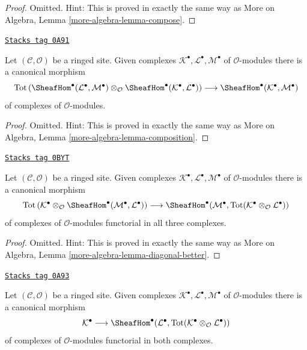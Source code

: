 \begin{proof}
Omitted. Hint: This is proved in exactly the same way as
More on Algebra, Lemma \ref{more-algebra-lemma-compose}.
\end{proof}

\begin{lemma}[Composition]
\label{sites-cohomology-lemma-composition}
\href{https://stacks.math.columbia.edu/tag/0A91}{\texttt{Stacks tag 0A91}}

Let $(\mathcal{C}, \mathcal{O})$ be a ringed site. Given complexes
$\mathcal{K}^\bullet, \mathcal{L}^\bullet, \mathcal{M}^\bullet$
of $\mathcal{O}$-modules there is a canonical morphism
$$
\text{Tot}\left(
\SheafHom^\bullet(\mathcal{L}^\bullet, \mathcal{M}^\bullet)
\otimes_\mathcal{O}
\SheafHom^\bullet(\mathcal{K}^\bullet, \mathcal{L}^\bullet)
\right)
\longrightarrow
\SheafHom^\bullet(\mathcal{K}^\bullet, \mathcal{M}^\bullet)
$$
of complexes of $\mathcal{O}$-modules.
\end{lemma}

\begin{proof}
Omitted. Hint: This is proved in exactly the same way as
More on Algebra, Lemma \ref{more-algebra-lemma-composition}.
\end{proof}

\begin{lemma}
\label{sites-cohomology-lemma-diagonal-better}
\href{https://stacks.math.columbia.edu/tag/0BYT}{\texttt{Stacks tag 0BYT}}

Let $(\mathcal{C}, \mathcal{O})$ be a ringed site. Given complexes
$\mathcal{K}^\bullet, \mathcal{L}^\bullet, \mathcal{M}^\bullet$
of $\mathcal{O}$-modules there is a canonical morphism
$$
\text{Tot}\left(
\mathcal{K}^\bullet \otimes_\mathcal{O}
\SheafHom^\bullet(\mathcal{M}^\bullet, \mathcal{L}^\bullet)
\right)
\longrightarrow
\SheafHom^\bullet(\mathcal{M}^\bullet,
\text{Tot}(\mathcal{K}^\bullet \otimes_\mathcal{O} \mathcal{L}^\bullet))
$$
of complexes of $\mathcal{O}$-modules functorial in all three complexes.
\end{lemma}

\begin{proof}
Omitted. Hint: This is proved in exactly the same way as
More on Algebra, Lemma \ref{more-algebra-lemma-diagonal-better}.
\end{proof}

\begin{lemma}[Diagonal]
\label{sites-cohomology-lemma-diagonal}
\href{https://stacks.math.columbia.edu/tag/0A93}{\texttt{Stacks tag 0A93}}

Let $(\mathcal{C}, \mathcal{O})$ be a ringed site. Given complexes
$\mathcal{K}^\bullet, \mathcal{L}^\bullet, \mathcal{M}^\bullet$
of $\mathcal{O}$-modules there is a canonical morphism
$$
\mathcal{K}^\bullet
\longrightarrow
\SheafHom^\bullet(\mathcal{L}^\bullet,
\text{Tot}(\mathcal{K}^\bullet \otimes_\mathcal{O} \mathcal{L}^\bullet))
$$
of complexes of $\mathcal{O}$-modules functorial in both complexes.
\end{lemma}

